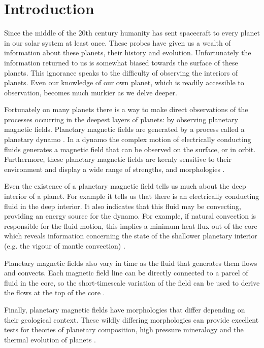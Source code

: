 
\chapter{Introduction}
\label{chap:introduction}
Since the middle of the 20th century humanity has sent spacecraft to every planet in our solar system at least once. These probes have given us a wealth of information about these planets, their history and evolution. Unfortunately the information returned to us is somewhat biased towards the surface of these planets. This ignorance speaks to the difficulty of observing the interiors of planets. Even our knowledge of our own planet, which is readily accessible to observation, becomes much murkier as we delve deeper. 

Fortunately on many planets there is a way to make direct observations of the processes occurring in the deepest layers of planets: by observing planetary magnetic fields. Planetary magnetic fields are generated by a process called a planetary dynamo \citep{larmor1919, jones2011}. In a dynamo the complex motion of electrically conducting fluids generates a magnetic field that can be observed on the surface, or in orbit. Furthermore, these planetary magnetic fields are keenly sensitive to their environment and display a wide range of strengths, and morphologies \citep{connerney2007, christensen2009review}.

Even the existence of a planetary magnetic field tells us much about the deep interior of a planet. For example it tells us that there is an electrically conducting fluid in the deep interior. It also indicates that this fluid may be convecting, providing an energy source for the dynamo. For example, if natural convection is responsible for the fluid motion, this implies a minimum heat flux out of the core which reveals information concerning the state of the shallower planetary interior (e.g. the vigour of mantle convection) \citep{breuer2010}.

Planetary magnetic fields also vary in time as the fluid that generates them flows and convects. Each magnetic field line can be directly connected to a parcel of fluid in the core, so the short-timescale variation of the field can be used to derive the flows at the top of the core \citep{bloxham1991,finlay2003}.

Finally, planetary magnetic fields have morphologies that differ depending on their geological context. These wildly differing morphologies can provide excellent tests for theories of planetary composition, high pressure mineralogy and the thermal evolution of planets \citep{stevenson2003}.

